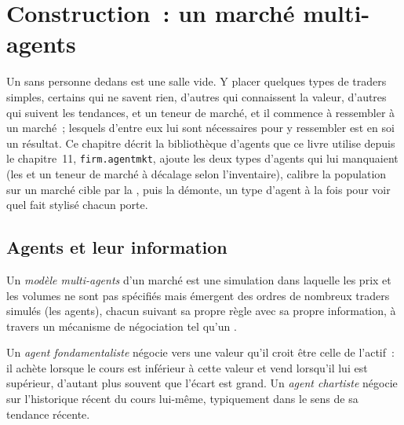 \chapter{Construction~: un marché multi-agents}\label{ch:mx:build-an-agent-based-market}

Un  sans personne dedans est une salle vide. Y placer quelques types de traders simples, certains qui ne savent rien, d'autres qui connaissent la valeur, d'autres
qui suivent les tendances, et un teneur de marché, et il commence à ressembler à un marché~; lesquels d'entre eux lui sont nécessaires pour y ressembler est en soi un résultat.
Ce chapitre décrit la bibliothèque d'agents que ce livre utilise depuis le chapitre~11, \texttt{firm.agentmkt}, ajoute les deux types d'agents qui lui manquaient (les 
et un teneur de marché à décalage selon l'inventaire), calibre la population sur un marché cible par la , puis la démonte, un type d'agent
à la fois pour voir quel fait stylisé chacun porte.

\section{Agents et leur information}

\begin{definition}\label{def:mx:build-an-agent-based-market:abm}
Un \emph{modèle multi-agents} d'un marché est une simulation dans laquelle les prix et les volumes ne sont pas spécifiés mais émergent des
ordres de nombreux traders simulés (les agents), chacun suivant sa propre règle avec sa propre information, à travers un mécanisme de négociation tel qu'un .
\end{definition}

\begin{definition}\label{def:mx:build-an-agent-based-market:types}
Un \emph{agent fondamentaliste} négocie vers une valeur qu'il croit être celle de l'actif~: il achète lorsque le cours est inférieur à cette
valeur et vend lorsqu'il lui est supérieur, d'autant plus souvent que l'écart est grand. Un \emph{agent chartiste} négocie sur l'historique récent du cours lui-même,
typiquement dans le sens de sa tendance récente.
\end{definition}

